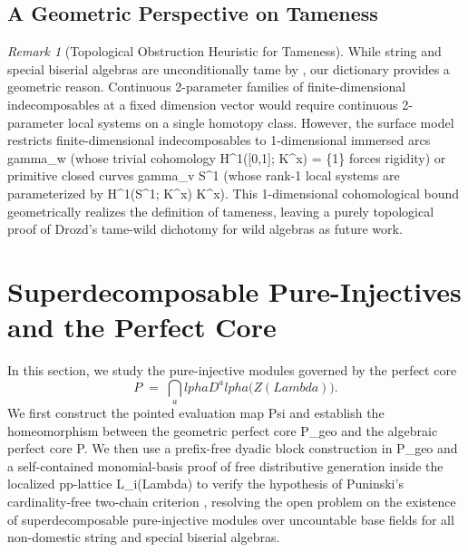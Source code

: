 \documentclass[11pt,a4paper,reqno]{amsart}
\def\({}%
\def\){}%
\def\mathcal#1{#1}%
\def\mathbb#1{#1}%
\def\mathrm#1{#1}%
\def\operatorname#1{#1}%
\def\K{K}%
\def\Zg{Z}%
\def\times{x}%
\def\gamma{gamma}%
\def\alpha{alpha}%
\def\Psi{Psi}%
\def\Lambda{Lambda}%
\theoremstyle{definition}
\theoremstyle{remark}
\newtheorem{remark}[theorem]{Remark}
\newcommand{\K}{\mathbb{K}}
\newcommand{\Zg}{\operatorname{Zg}}
\begin{document}
\subsection{A Geometric Perspective on Tameness}
\label{subsec:tameness_heuristic}

\begin{remark}[Topological Obstruction Heuristic for Tameness]
\label{rem:tameness_heuristic}
While string and special biserial algebras are unconditionally tame by \cite{WaldWaschbusch1985, ButlerRingel1987}, our dictionary provides a geometric reason. Continuous 2-parameter families of finite-dimensional indecomposables at a fixed dimension vector would require continuous 2-parameter local systems on a single homotopy class. However, the surface model restricts finite-dimensional indecomposables to 1-dimensional immersed arcs \(\gamma_w \simeq [0,1]\) (whose trivial cohomology \(H^1([0,1]; \K^\times) = \{1\}\) forces rigidity) or primitive closed curves \(\gamma_v \simeq S^1\) (whose rank-\(1\) local systems are parameterized by \(H^1(S^1; \K^\times) \cong \K^\times\)). This 1-dimensional cohomological bound geometrically realizes the definition of tameness, leaving a purely topological proof of Drozd's tame-wild dichotomy for wild algebras as future work.
\end{remark}

\vspace{-0.5em}
\section{Superdecomposable Pure-Injectives and the Perfect Core}
\label{sec:superdecomposables}

In this section, we study the pure-injective modules governed by the perfect core
\[
\mathcal{P} \;=\; \bigcap_\alpha D^\alpha\bigl(\Zg(\Lambda)\bigr).
\]
We first construct the pointed evaluation map \(\Psi\) and establish the homeomorphism between the geometric perfect core \(\mathcal{P}_{\mathrm{geo}}\) and the algebraic perfect core \(\mathcal{P}\). We then use a prefix-free dyadic block construction in \(\mathcal{P}_{\mathrm{geo}}\) and a self-contained monomial-basis proof of free distributive generation inside the localized pp-lattice \(\mathcal{L}_i(\Lambda)\) to verify the hypothesis of Puninski's cardinality-free two-chain criterion \cite[Theorem~2.3]{Puninski2008}, resolving the open problem on the existence of superdecomposable pure-injective modules over uncountable base fields for all non-domestic string and special biserial algebras.
\end{document}
